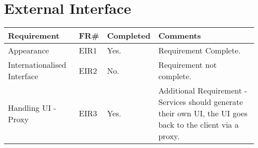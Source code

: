 \section{External Interface}
\begin{tabular}{ |p{5cm}|l|l|p{8cm}|}
\hline
\textbf{Requirement}	&	\textbf{FR\#}	&	\textbf{Completed}	&	\textbf{Comments} \\
\hline
Appearance & EIR1 & Yes. & Requirement Complete. \\
\hline
Internationalised Interface & EIR2 & No. & Requirement not complete. \\
\hline
Handling UI - Proxy & EIR3 & Yes. & Additional Requirement - Services should generate their own UI, the UI goes back to the client via a proxy. \\
\hline
\end{tabular}
